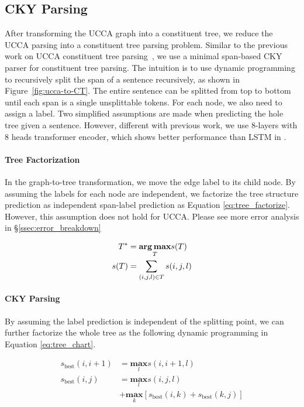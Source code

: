 \subsection{CKY Parsing}
\label{ssec:phr:cky}
After transforming the UCCA graph into a constituent tree, we reduce
the UCCA parsing into a constituent tree parsing problem. Similar to
the previous work on UCCA constituent tree
parsing~\cite{jiang2019hlt}, we use a minimal span-based CKY parser
for constituent tree parsing.  The intuition is to use dynamic
programming to recursively split the span of a sentence recursively,
as shown in Figure~\ref{fig:ucca-to-CT}. The entire sentence can be
splitted from top to bottom until each span is a single unsplittable
tokens. For each node, we also need to assign a label. Two simplified
assumptions are made when predicting the hole tree given a
sentence. However, different with previous work, we use 8-layers with
8 heads transformer encoder, which shows better performance than LSTM
in \citet{kitaev2018constituency}.

\paragraph{Tree Factorization} In the graph-to-tree transformation, we
move the edge label to its child node. By assuming the labels for each
node are independent, we factorize the tree structure prediction as
independent span-label prediction as Equation
\ref{eq:tree_factorize}. However, this assumption does not hold for UCCA.
Please see more error analysis in \S \ref{ssec:error_breakdown}

\begin{equation}
  \label{eq:tree_factorize}
 \begin{aligned} T^{*}  & = \underset{T}{\textbf{arg\,max}} s(T)     \\ s(T)
                        & = \sum_{(i,j,l) \in T} s(i,j,l)
\end{aligned}
\end{equation}

\paragraph{CKY Parsing} By assuming the label prediction is
independent of the splitting point, we can further factorize the whole
tree as the following dynamic programming in Equation \ref{eq:tree_chart}.

\begin{equation}
  \label{eq:tree_chart}
\begin{aligned}
      s_{\text{best}}(i, i+1) & = \underset{l}{\textbf{max}} s(i,i+1, l) \\
      s_{\text{best}}(i, j) & = \underset{l}{\textbf{max}} s(i,j, l)
      \\ & + \underset{k}{\textbf{max}}[ s_{\text{best}}(i,k) +
      s_{\text{best}}(k,j) ]
\end{aligned}
\end{equation}

